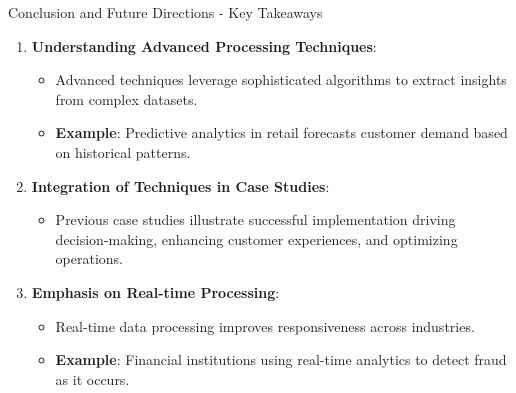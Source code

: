 \documentclass[aspectratio=169]{beamer}
\begin{document}
\begin{frame}[fragile]{Conclusion and Future Directions - Key Takeaways}
    \begin{enumerate}
        \item \textbf{Understanding Advanced Processing Techniques}:
            \begin{itemize}
                \item Advanced techniques leverage sophisticated algorithms to extract insights from complex datasets.
                \item \textbf{Example}: Predictive analytics in retail forecasts customer demand based on historical patterns.
            \end{itemize}
        
        \item \textbf{Integration of Techniques in Case Studies}:
            \begin{itemize}
                \item Previous case studies illustrate successful implementation driving decision-making, enhancing customer experiences, and optimizing operations.
            \end{itemize}

        \item \textbf{Emphasis on Real-time Processing}:
            \begin{itemize}
                \item Real-time data processing improves responsiveness across industries.
                \item \textbf{Example}: Financial institutions using real-time analytics to detect fraud as it occurs.
            \end{itemize}
    \end{enumerate}
\end{frame}
\end{document}
